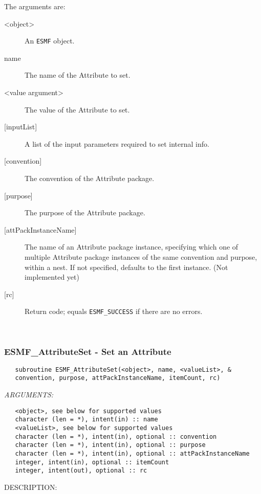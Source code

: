    The arguments are:
   \begin{description}
   \item [<object>]
   An {\tt ESMF} object.
   \item [name]
   The name of the Attribute to set.
   \item [<value argument>]
   The value of the Attribute to set.
   \item [{[inputList]}]
   A list of the input parameters required to set internal info.
   \item [{[convention]}]
   The convention of the Attribute package.
   \item [{[purpose]}]
   The purpose of the Attribute package.
   \item [{[attPackInstanceName]}]
   The name of an Attribute package instance, specifying which one
   of multiple Attribute package instances of the same convention
   and purpose, within a nest. If not specified, defaults to the
   first instance. (Not implemented yet)
   \item [{[rc]}]
   Return code; equals {\tt ESMF\_SUCCESS} if there are no errors.
   \end{description}
  
   
 
\mbox{}\hrulefill\ 
 
\subsubsection [ESMF\_AttributeSet] {ESMF\_AttributeSet - Set an Attribute}


  
\begin{verbatim}   subroutine ESMF_AttributeSet(<object>, name, <valueList>, &
   convention, purpose, attPackInstanceName, itemCount, rc)\end{verbatim}{\em ARGUMENTS:}
\begin{verbatim}   <object>, see below for supported values
   character (len = *), intent(in) :: name
   <valueList>, see below for supported values
   character (len = *), intent(in), optional :: convention
   character (len = *), intent(in), optional :: purpose
   character (len = *), intent(in), optional :: attPackInstanceName
   integer, intent(in), optional :: itemCount
   integer, intent(out), optional :: rc\end{verbatim}
{\sf DESCRIPTION:\\ }


